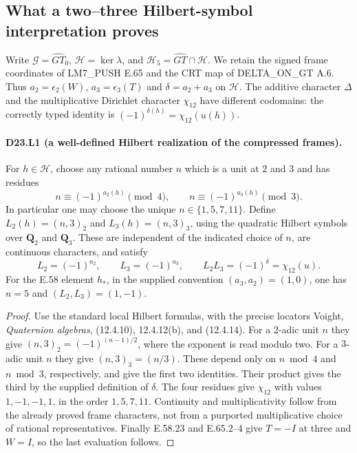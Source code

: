 \subsection{What a two--three Hilbert-symbol interpretation proves}

Write $\mathcal G=\widehat{GT}_0$, $\mathcal H=\ker\lambda$, and
$\mathcal H_5=\widehat{GT}\cap\mathcal H$. We retain the signed
frame coordinates of LM7\_PUSH E.65 and the CRT map of
DELTA\_ON\_GT A.6. Thus $a_2=\epsilon_2(W)$,
$a_3=\epsilon_3(T)$ and $\delta=a_2+a_3$ on $\mathcal H$.
The additive character $\Delta$ and the multiplicative Dirichlet
character $\chi_{12}$ have different codomains: the correctly typed
identity is $(-1)^{\delta(h)}=\chi_{12}(u(h))$.

\paragraph{D23.L1 (a well-defined Hilbert realization of the compressed frames).}
For $h\in\mathcal H$, choose any rational number $n$ which is a unit
at $2$ and $3$ and has residues
\[
n\equiv(-1)^{a_2(h)}\pmod4,\qquad
n\equiv(-1)^{a_3(h)}\pmod3.
\]
In particular one may choose the unique $n\in\{1,5,7,11\}$.
Define $L_2(h)=(n,3)_2$ and $L_3(h)=(n,3)_3$, using the quadratic
Hilbert symbols over $\mathbf Q_2$ and $\mathbf Q_3$. These are
independent of the indicated choice of $n$, are continuous characters,
and satisfy
\[
L_2=(-1)^{a_2},\qquad L_3=(-1)^{a_3},\qquad
L_2L_3=(-1)^\delta=\chi_{12}(u).
\tag{D23.L1.1}
\]
For the E.58 element $h_*$, in the supplied convention
$(a_3,a_2)=(1,0)$, one has $n=5$ and $(L_2,L_3)=(1,-1)$.
\begin{proof}
Use the standard local Hilbert formulas, with the precise locators
Voight, \emph{Quaternion algebras}, (12.4.10), 12.4.12(b), and
(12.4.14). For a $2$-adic unit $n$ they give
$(n,3)_2=(-1)^{(n-1)/2}$, where the exponent is read modulo two.
For a $3$-adic unit $n$ they give $(n,3)_3=(n/3)$.
These depend only on $n\bmod4$ and $n\bmod3$, respectively, and
give the first two identities. Their product gives the third by
the supplied definition of $\delta$. The four residues give
$\chi_{12}$ with values $1,-1,-1,1$, in the order $1,5,7,11$.
Continuity and multiplicativity follow from the already proved
frame characters, not from a purported multiplicative choice of
rational representatives. Finally E.58.23 and E.65.2--4 give
$T=-I$ at three and $W=I$, so the last evaluation follows.
\end{proof}

